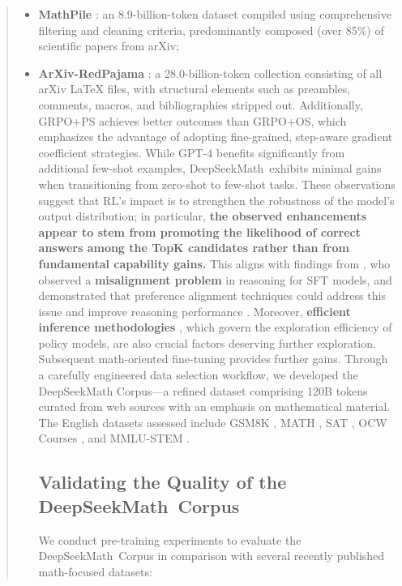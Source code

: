 \begin{abstract}
\begin{itemize}
\begin{itemize}[topsep=0pt]
    \item \textbf{MathPile} \citep{mathpile}: an 8.9-billion-token dataset compiled using comprehensive filtering and cleaning criteria, predominantly composed (over 85\%) of scientific papers from arXiv;
    \item \textbf{ArXiv-RedPajama} \citep{redpajama}: a 28.0-billion-token collection consisting of all arXiv LaTeX files, with structural elements such as preambles, comments, macros, and bibliographies stripped out. Additionally, GRPO+PS achieves better outcomes than GRPO+OS, which emphasizes the advantage of adopting fine-grained, step-aware gradient coefficient strategies. While GPT-4 benefits significantly from additional few-shot examples, DeepSeekMath~exhibits minimal gains when transitioning from zero-shot to few-shot tasks. These observations suggest that RL's impact is to strengthen the robustness of the model's output distribution; in particular, \textbf{the observed enhancements appear to stem from promoting the likelihood of correct answers among the TopK candidates rather than from fundamental capability gains.} This aligns with findings from \citep{wang2023making}, who observed a \textbf{misalignment problem} in reasoning for SFT models, and demonstrated that preference alignment techniques could address this issue and improve reasoning performance \citep{yuan2023rrhf,song2023preference,wang2023making}. Moreover, \textbf{efficient inference methodologies} \citep{xia-etal-2023-speculative,leviathan2023fast,kwon2023efficient,xia2024unlocking}, which govern the exploration efficiency of policy models, are also crucial factors deserving further exploration. Subsequent math-oriented fine-tuning provides further gains. Through a carefully engineered data selection workflow, we developed the DeepSeekMath Corpus—a refined dataset comprising 120B tokens curated from web sources with an emphasis on mathematical material. The English datasets assessed include GSM8K \citep{gsm8k}, MATH \citep{MATH}, SAT \citep{llemma}, OCW Courses \citep{minerva}, and MMLU-STEM \citep{mmlu}. \subsection{Validating the Quality of the DeepSeekMath~Corpus}

We conduct pre-training experiments to evaluate the DeepSeekMath~Corpus in comparison with several recently published math-focused datasets:


\end{itemize}
\end{itemize}
\end{abstract}
